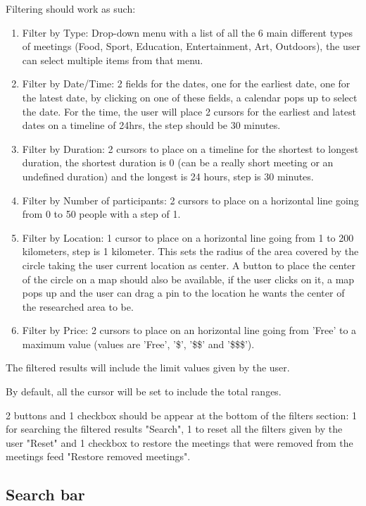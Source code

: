 \documentclass[conference]{IEEEtran}
\begin{document}
Filtering should work as such:

\begin{enumerate}
    \item Filter by Type: Drop-down menu with a list of all the 6 main different types of meetings (Food, Sport, Education, Entertainment, Art, Outdoors), the user can select multiple items from that menu.
    \item Filter by Date/Time: 2 fields for the dates, one for the earliest date, one for the latest date, by clicking on one of these fields, a calendar pops up to select the date. For the time, the user will place 2 cursors for the earliest and latest dates on a timeline of 24hrs, the step should be 30 minutes.
    \item Filter by Duration: 2 cursors to place on a timeline for the shortest to longest duration, the shortest duration is 0 (can be a really short meeting or an undefined duration) and the longest is 24 hours, step is 30 minutes.
    \item Filter by Number of participants: 2 cursors to place on a horizontal line going from 0 to 50 people with a step of 1. 
    \item Filter by Location: 1 cursor to place on a horizontal line going from 1 to 200 kilometers, step is 1 kilometer. This sets the radius of the area covered by the circle taking the user current location as center. A button to place the center of the circle on a map should also be available, if the user clicks on it, a map pops up and the user can drag a pin to the location he wants the center of the researched area to be.
    \item Filter by Price: 2 cursors to place on an horizontal line going from 'Free' to a maximum value (values are 'Free', '\$', '\$\$' and '\$\$\$').
\end{enumerate}

The filtered results will include the limit values given by the user.

By default, all the cursor will be set to include the total ranges.

2 buttons and 1 checkbox should be appear at the bottom of the filters section: 1 for searching the filtered results "Search", 1 to reset all the filters given by the user "Reset" and 1 checkbox to restore the meetings that were removed from the meetings feed "Restore removed meetings".

\subsection{Search bar}
\end{document}
